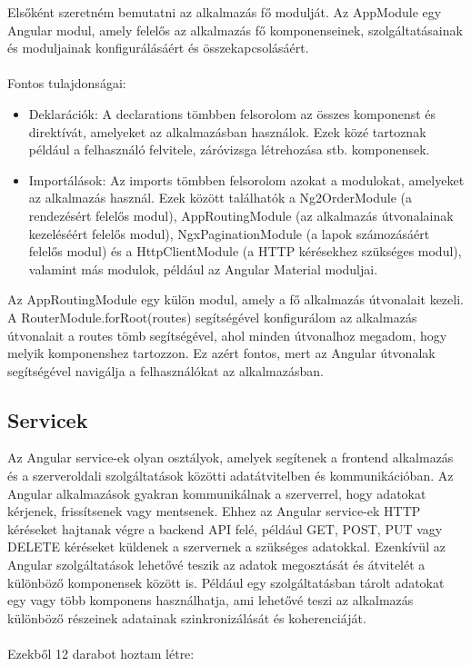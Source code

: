 Elsőként szeretném bemutatni az alkalmazás fő modulját. Az AppModule egy Angular modul, amely felelős az alkalmazás fő komponenseinek, szolgáltatásainak és moduljainak konfigurálásáért és összekapcsolásáért. \\
\\Fontos tulajdonságai:

\begin{itemize}

\item{Deklarációk:} A declarations tömbben felsorolom az összes komponenst és direktívát, amelyeket az alkalmazásban használok. Ezek közé tartoznak például a felhasználó felvitele, záróvizsga létrehozása stb. komponensek. 

\item{Importálások:} Az imports tömbben felsorolom azokat a modulokat, amelyeket az alkalmazás használ. Ezek között találhatók a Ng2OrderModule (a rendezésért felelős modul), AppRoutingModule (az alkalmazás útvonalainak kezeléséért felelős modul), NgxPaginationModule (a lapok számozásáért felelős modul) és a HttpClientModule (a HTTP kérésekhez szükséges modul), valamint más modulok, például az Angular Material moduljai.

\end{itemize}

Az AppRoutingModule egy külön modul, amely a fő alkalmazás útvonalait kezeli. A RouterModule.forRoot(routes) segítségével konfigurálom az alkalmazás útvonalait a routes tömb segítségével, ahol minden útvonalhoz megadom, hogy melyik komponenshez tartozzon. Ez azért fontos, mert az Angular útvonalak segítségével navigálja a felhasználókat az alkalmazásban.


\subsection{Servicek}

Az Angular service-ek olyan osztályok, amelyek segítenek a frontend alkalmazás és a szerveroldali  szolgáltatások közötti adatátvitelben és kommunikációban. Az Angular alkalmazások gyakran kommunikálnak a szerverrel, hogy adatokat kérjenek, frissítsenek vagy mentsenek. Ehhez az Angular service-ek HTTP kéréseket hajtanak végre a backend API felé, például GET, POST, PUT vagy DELETE kéréseket küldenek a szervernek a szükséges adatokkal. Ezenkívül az Angular szolgáltatások lehetővé teszik az adatok megosztását és átvitelét a különböző komponensek között is. Például egy szolgáltatásban tárolt adatokat egy vagy több komponens használhatja, ami lehetővé teszi az alkalmazás különböző részeinek adatainak szinkronizálását és koherenciáját.\\
\\Ezekből 12 darabot hoztam létre:

